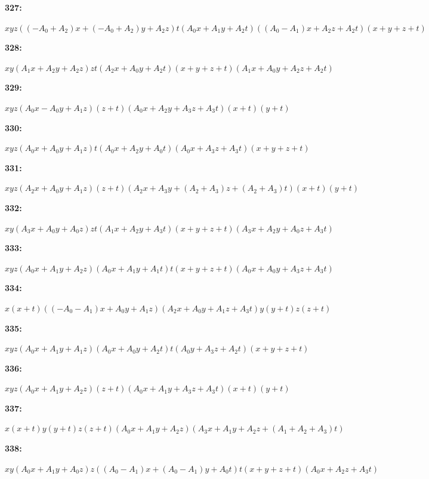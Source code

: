 \documentclass[12pt]{amsart}
\theoremstyle{plain}
\theoremstyle{remark}
\theoremstyle{definition}
\numberwithin{table}{section}
\begin{document}
\noindent\parbox[right]{9mm}{\textbf{327:}}\parbox{3mm}{\hfill}%
\parbox[t]{15cm}{\(xyz((-A_{0} + A_{2})x + (-A_{0} + A_{2})y + A_{2}z)t(A_{0}x + A_{1}y + A_{2}t)((A_{0} - A_{1})x + A_{2}z + A_{2}t)(x + y + z + t)\)}

\noindent\parbox[right]{9mm}{\textbf{328:}}\parbox{3mm}{\hfill}%
\parbox[t]{15cm}{\(xy(A_{1}x + A_{2}y + A_{2}z)zt(A_{2}x + A_{0}y + A_{2}t)(x + y + z + t)(A_{1}x + A_{0}y + A_{2}z + A_{2}t)\)}

\noindent\parbox[right]{9mm}{\textbf{329:}}\parbox{3mm}{\hfill}%
\parbox[t]{15cm}{\(xyz(A_{0}x - A_{0}y + A_{1}z)(z + t)(A_{0}x + A_{2}y + A_{3}z + A_{3}t)(x + t)(y + t)\)}

\noindent\parbox[right]{9mm}{\textbf{330:}}\parbox{3mm}{\hfill}%
\parbox[t]{15cm}{\(xyz(A_{0}x + A_{0}y + A_{1}z)t(A_{0}x + A_{2}y + A_{0}t)(A_{0}x + A_{3}z + A_{3}t)(x + y + z + t)\)}

\noindent\parbox[right]{9mm}{\textbf{331:}}\parbox{3mm}{\hfill}%
\parbox[t]{15cm}{\(xyz(A_{2}x + A_{0}y + A_{1}z)(z + t)(A_{2}x + A_{3}y + (A_{2} + A_{3})z + (A_{2} + A_{3})t)(x + t)(y + t)\)}

\noindent\parbox[right]{9mm}{\textbf{332:}}\parbox{3mm}{\hfill}%
\parbox[t]{15cm}{\(xy(A_{3}x + A_{0}y + A_{0}z)zt(A_{1}x + A_{2}y + A_{3}t)(x + y + z + t)(A_{3}x + A_{2}y + A_{0}z + A_{3}t)\)}

\noindent\parbox[right]{9mm}{\textbf{333:}}\parbox{3mm}{\hfill}%
\parbox[t]{15cm}{\(xyz(A_{0}x + A_{1}y + A_{2}z)(A_{0}x + A_{1}y + A_{1}t)t(x + y + z + t)(A_{0}x + A_{0}y + A_{3}z + A_{3}t)\)}

\noindent\parbox[right]{9mm}{\textbf{334:}}\parbox{3mm}{\hfill}%
\parbox[t]{15cm}{\(x(x + t)((-A_{0} - A_{1})x + A_{0}y + A_{1}z)(A_{2}x + A_{0}y + A_{1}z + A_{3}t)y(y + t)z(z + t)\)}

\noindent\parbox[right]{9mm}{\textbf{335:}}\parbox{3mm}{\hfill}%
\parbox[t]{15cm}{\(xyz(A_{0}x + A_{1}y + A_{1}z)(A_{0}x + A_{0}y + A_{2}t)t(A_{0}y + A_{3}z + A_{2}t)(x + y + z + t)\)}

\noindent\parbox[right]{9mm}{\textbf{336:}}\parbox{3mm}{\hfill}%
\parbox[t]{15cm}{\(xyz(A_{0}x + A_{1}y + A_{2}z)(z + t)(A_{0}x + A_{1}y + A_{3}z + A_{3}t)(x + t)(y + t)\)}

\noindent\parbox[right]{9mm}{\textbf{337:}}\parbox{3mm}{\hfill}%
\parbox[t]{15cm}{\(x(x + t)y(y + t)z(z + t)(A_{0}x + A_{1}y + A_{2}z)(A_{3}x + A_{1}y + A_{2}z + (A_{1} + A_{2} + A_{3})t)\)}

\noindent\parbox[right]{9mm}{\textbf{338:}}\parbox{3mm}{\hfill}%
\parbox[t]{15cm}{\(xy(A_{0}x + A_{1}y + A_{0}z)z((A_{0} - A_{1})x + (A_{0} - A_{1})y + A_{0}t)t(x + y + z + t)(A_{0}x + A_{2}z + A_{3}t)\)}
\end{document}
